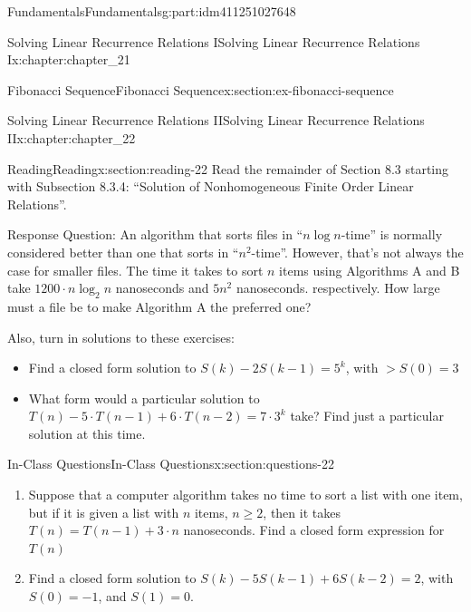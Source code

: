 \documentclass[oneside,10pt,]{book}
\numberwithin{equation}{section}
\begin{document}
\begin{partptx}{Fundamentals}{}{Fundamentals}{}{}{g:part:idm411251027648}
\begin{chapterptx}{Solving Linear Recurrence Relations I}{}{Solving Linear Recurrence Relations I}{}{}{x:chapter:chapter_21}
\begin{sectionptx}{Fibonacci Sequence}{}{Fibonacci Sequence}{}{}{x:section:ex-fibonacci-sequence}
\end{sectionptx}
\end{chapterptx}
%
\typeout{************************************************}
\typeout{************************************************}
%
\begin{chapterptx}{Solving Linear Recurrence Relations II}{}{Solving Linear Recurrence Relations II}{}{}{x:chapter:chapter_22}
\index{}%
%
%
\typeout{************************************************}
\typeout{************************************************}
%
\begin{sectionptx}{Reading}{}{Reading}{}{}{x:section:reading-22}
Read the remainder of Section 8.3 starting with Subsection 8.3.4: “Solution of Nonhomogeneous Finite Order Linear Relations”.%
\par
Response Question: An algorithm that sorts files in ``\(n \log{n}\)-time'' is normally considered better than one that sorts in ``\(n^2\)-time''.  However, that's not always the case for smaller files.  The time it takes to sort \(n\) items using Algorithms A and B take \(1200\cdot n \log_2{n}\) nanoseconds and \(5 n^2\) nanoseconds. respectively. How large must a file be to make Algorithm A the preferred one?%
\par
Also, turn in solutions to these exercises:%
\begin{itemize}[label=\textbullet]
\item{}Find a closed form solution to \(S(k) - 2 S (k - 1) = 5^k\), with \(>S(0) = 3\)%
\item{}What form would a particular solution to \(T(n)-5\cdot T(n-1)+6\cdot T(n-2)=7 \cdot 3^k\) take?  Find just a particular solution at this time.%
\end{itemize}
%
\end{sectionptx}
%
%
\typeout{************************************************}
\typeout{************************************************}
%
\begin{sectionptx}{In-Class Questions}{}{In-Class Questions}{}{}{x:section:questions-22}
%
\begin{enumerate}[label=\arabic*.]
\item{}Suppose that a computer algorithm takes no time to sort a list with one item, but if it is given a list with \(n\) items, \(n \geq 2\), then it takes \(T(n) = T(n-1) + 3\cdot n\) nanoseconds.  Find a closed form expression for \(T(n)\)%
\item{}Find a closed form solution to \(S(k) - 5S(k - 1) + 6S(k - 2) = 2\), with \(S(0) = -1\), and \(S(1) = 0\).%

\end{enumerate}
\end{sectionptx}
\end{chapterptx}
\end{partptx}
\end{document}
